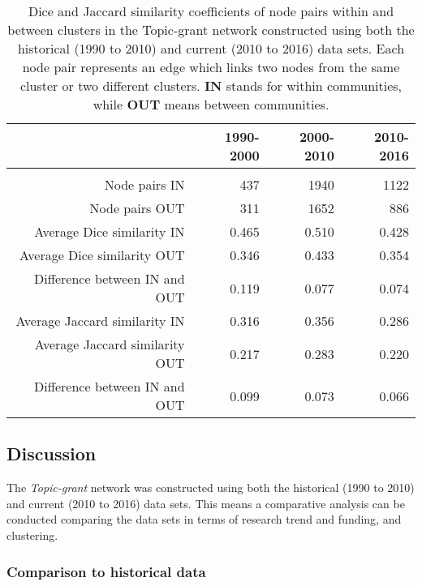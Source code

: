 \begin{table}[htbp]
\centering
\caption[Dice and Jaccard similarity coefficients of node pairs within and between clusters in the Topic-grant constructed using both the historical (1990 to 2010) and current (2010 to 2016) data sets.]{Dice and Jaccard similarity coefficients of node pairs within and between clusters in the Topic-grant network constructed using both the historical (1990 to 2010) and current (2010 to 2016) data sets. Each node pair represents an edge which links two nodes from the same cluster or two different clusters. \textbf{IN} stands for within communities, while \textbf{OUT} means between communities.}
\label{table:topic_a_evaluation}
\begin{tabular}{r|rrr}
{} & \textbf{1990-2000} & \textbf{2000-2010} & \textbf{2010-2016}\\
\hline\\
Node pairs IN                  & {437}   & {1940}  & {1122}\\
Node pairs OUT                 & {311}   & {1652}  & {886}\\
Average Dice similarity IN     & {0.465} & {0.510} & {0.428}\\
Average Dice similarity OUT    & {0.346} & {0.433} & {0.354}\\
Difference between IN and OUT  & {0.119} & {0.077} & {0.074}\\
Average Jaccard similarity IN  & {0.316} & {0.356} & {0.286}\\
Average Jaccard similarity OUT & {0.217} & {0.283} & {0.220}\\
Difference between IN and OUT  & {0.099} & {0.073} & {0.066}\\
\end{tabular}
\end{table}

\clearpage

\subsection{Discussion}

The \textit{Topic-grant} network was constructed using both the historical (1990 to 2010) and current (2010 to 2016) data sets. This means a comparative analysis can be conducted comparing the data sets in terms of research trend and funding, and clustering.

\subsubsection{Comparison to historical data}

